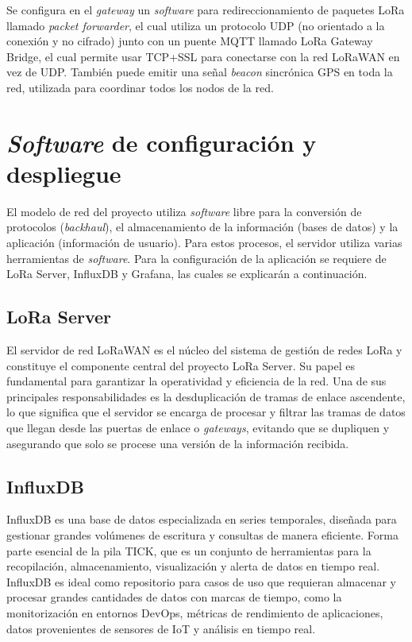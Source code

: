 Se configura en el \emph{gateway} un \emph{software} para redireccionamiento de paquetes LoRa llamado \emph{packet forwarder}, el cual utiliza un protocolo UDP (no orientado a la conexión y no cifrado) junto con un puente MQTT llamado LoRa Gateway Bridge, el cual permite usar TCP+SSL para conectarse con la red LoRaWAN en vez de UDP. También puede emitir una señal \emph{beacon} sincrónica GPS en toda la red, utilizada para coordinar todos los nodos de la red.

\section{\emph{Software} de configuración y despliegue}

El modelo de red del proyecto utiliza \emph{software} libre para la conversión de protocolos (\emph{backhaul}), el almacenamiento de la información (bases de datos) y la aplicación (información de usuario). Para estos procesos, el servidor utiliza varias herramientas de \emph{software}. Para la configuración de la aplicación se requiere de LoRa Server, InfluxDB y Grafana, las cuales se explicarán a continuación.

\subsection{LoRa Server}

El servidor de red LoRaWAN es el núcleo del sistema de gestión de redes LoRa y constituye el componente central del proyecto LoRa Server. Su papel es fundamental para garantizar la operatividad y eficiencia de la red. Una de sus principales responsabilidades es la desduplicación de tramas de enlace ascendente, lo que significa que el servidor se encarga de procesar y filtrar las tramas de datos que llegan desde las puertas de enlace o \emph{gateways}, evitando que se dupliquen y asegurando que solo se procese una versión de la información recibida.

\subsection{InfluxDB}

InfluxDB es una base de datos especializada en series temporales, diseñada para gestionar grandes volúmenes de escritura y consultas de manera eficiente. Forma parte esencial de la pila TICK, que es un conjunto de herramientas para la recopilación, almacenamiento, visualización y alerta de datos en tiempo real. InfluxDB es ideal como repositorio para casos de uso que requieran almacenar y procesar grandes cantidades de datos con marcas de tiempo, como la monitorización en entornos DevOps, métricas de rendimiento de aplicaciones, datos provenientes de sensores de IoT y análisis en tiempo real.

